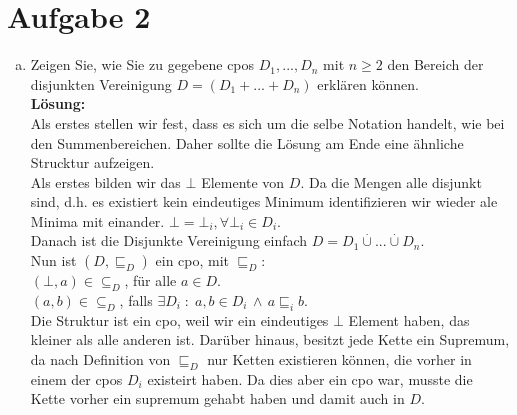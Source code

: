 \documentclass[11pt,a4paper,ngerman]{article}
\begin{document}
\section*{Aufgabe 2}

\begin{enumerate}[(a)]
	\item Zeigen Sie, wie Sie zu gegebene cpos $D_1,...,D_n$ mit $n \geq 2$ den Bereich der disjunkten Vereinigung 
		$D = (D_1+...+D_n)$ erklären können.\\
	\textbf{Lösung:}\\
		Als erstes stellen wir fest, dass es sich um die selbe Notation handelt, wie bei den Summenbereichen. Daher sollte
		die Lösung am Ende eine ähnliche Strucktur aufzeigen.\\

		Als erstes bilden wir das $\bot$ Elemente von $D$. Da die Mengen alle disjunkt sind, d.h. es existiert kein eindeutiges Minimum
		identifizieren wir wieder ale Minima mit einander. $\bot = \bot_i, \forall \bot_i \in D_i$.\\
		Danach ist die Disjunkte Vereinigung einfach $D = D_1 \overset{\cdot}{\cup} ... \overset{\cdot}{\cup} D_n$.\\

		Nun ist $(D, \sqsubseteq_D)$ ein cpo, mit $\sqsubseteq_D$:\\
		$(\bot,a) \in \subseteq_D$, für alle $a \in D$.\\
		$(a,b) \in \subseteq_D$, falls $\exists D_i \; : \; a,b \in D_i \, \land\, a \sqsubseteq_i b$.\\

		Die Struktur ist ein cpo, weil wir ein eindeutiges $\bot$ Element haben, das kleiner als alle anderen ist.
		Darüber hinaus, besitzt jede Kette ein Supremum, da nach Definition von $\sqsubseteq_D$ nur Ketten
		existieren können, die vorher in einem der cpos $D_i$ existeirt haben. Da dies aber ein cpo war,
		musste die Kette vorher ein supremum gehabt haben und damit auch in $D$.


\end{enumerate}
\end{document}
